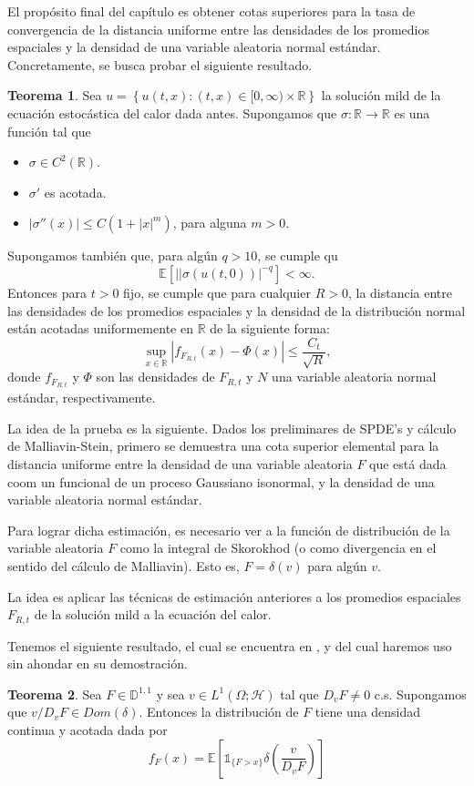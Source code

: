 \documentclass[letterpaper,twoside]{book}
\newcommand{\R}{\mathbb{R}}
\newcommand{\D}{\mathbb{D}}
\newcommand{\E}{\mathbb{E}}
\newcommand{\1}{\mathds{1}}
\newcommand{\abs}[1]{\left\lvert #1 \right\rvert}
\renewcommand{\to}{\rightarrow}
\theoremstyle{definition}
\theoremstyle{definition}
\newtheorem{teo}{Teorema}
\theoremstyle{definition}
\theoremstyle{definition}
\theoremstyle{definition}
\theoremstyle{definition}
\theoremstyle{definition}
\begin{document}
El propósito final del capítulo es obtener cotas superiores para la tasa de convergencia de la distancia uniforme entre las densidades de los promedios espaciales y la densidad de una variable aleatoria normal estándar. Concretamente, se busca probar el siguiente resultado.
\begin{teo} 
 Sea $u=\left\{u(t,x):(t,x)\in [0,\infty)\times\R\right\}$ la solución mild de la ecuación estocástica del calor dada antes. Supongamos que $\sigma:\R\to\R$ es una función tal que 
 \begin{itemize}
    \item $\sigma\in C^2(\R)$.
    \item $\sigma'$ es acotada.
    \item $\abs{\sigma''(x)}\leq C(1+\abs{x}^{m})$, \qquad para alguna $m>0$.
 \end{itemize}
 Supongamos también que, para algún $q>10$, se cumple qu 
 \[
 \E\left[\abs{|\sigma(u(t,0))}^{-q}\right]<\infty.    
 \]
 Entonces para $t>0$ fijo, se cumple que para cualquier $R>0$, la distancia entre las densidades de los promedios espaciales y la densidad de la distribución normal están acotadas uniformemente en $\R$ de la siguiente forma:
 \[
 \sup_{x\in \R} \abs{f_{F_{R,t}}(x)-\Phi(x)}\leq \frac{C_t}{\sqrt{R}},   
 \]
 donde $f_{F_{R,t}}$ y $\Phi$ son las densidades de $F_{R,t}$ y $N$ una variable aleatoria normal estándar, respectivamente.
 \end{teo}

 La idea de la prueba es la siguiente. Dados los preliminares de SPDE's y cálculo de Malliavin-Stein, primero se demuestra una cota superior elemental para la distancia uniforme entre la densidad de una variable aleatoria $F$ que está dada coom un funcional de un proceso Gaussiano isonormal, y la densidad de una variable aleatoria normal estándar.

 Para lograr dicha estimación, es necesario ver a la función de distribución de la variable aleatoria $F$ como la integral de Skorokhod (o como divergencia en el sentido del cálculo de Malliavin). Esto es, $F=\delta(v)$ para algún $v$.

La idea es aplicar las técnicas de estimación anteriores a los promedios espaciales $F_{R,t}$ de la solución mild a la ecuación del calor. 

Tenemos el siguiente resultado, el cual se encuentra en \cite{Caballero1998-hz}, y del cual haremos uso sin ahondar en su demostración.
\begin{teo} 
 Sea $F\in \D^{1,1}$ y  sea $v\in L^{1}(\Omega;\mathcal{H})$ tal que $D_vF\neq 0$ c.s. Supongamos que $v/D_vF\in Dom(\delta)$. Entonces la distribución de $F$ tiene una densidad continua y acotada dada por 
 \[
 f_F(x)=\E\left[\1_{\{F>x\}}\delta \left(\frac{v}{D_vF}\right)\right]   
 \]
 \end{teo}
\end{document}

